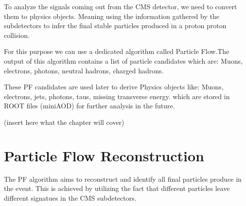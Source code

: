 


To analyze the signals coming out from the CMS detector, we need to convert them to physics objects. Meaning using the information gathered by the subdetectors to infer the final stable particles produced in a proton proton collision.  

For this purpose we can use a dedicated algorithm called Particle Flow.The output of this algorithm contains a list of particle candidates which are: Muons, electrons, photons, neutral hadrons, charged hadrons.

These PF candidates are used later to derive Physics objects like: Muons, electrons, jets, photons, taus,  missing transverse energy. 
which are stored in ROOT files (miniAOD) for further analysis in the future.  

(insert here what the chapter will cover) 



\section{Particle Flow Reconstruction}


The PF algorithm aims to reconstruct and identify all final particles produce in the event.
This is achieved  by utilizing the fact that different particles leave different signatues in the CMS subdetectors.


